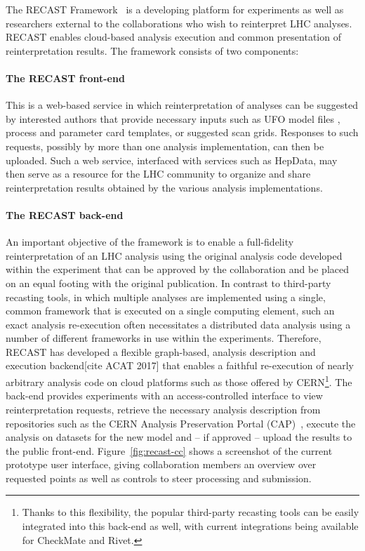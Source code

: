 The RECAST Framework~\cite{Cranmer2011} is a developing platform for experiments as well as  researchers external to the collaborations who wish to reinterpret LHC analyses. RECAST enables cloud-based analysis execution and common presentation of reinterpretation results. The framework consists of two components:

\paragraph{The RECAST front-end} This is a web-based service in which reinterpretation of analyses can be suggested by interested authors that provide necessary inputs such as UFO model files \cite{Degrande:2011ua}, process and parameter card templates, or suggested scan grids. Responses to such requests, possibly by more than one analysis implementation, can then be uploaded. Such a web service, interfaced with services such as HepData, may then serve as a resource for the LHC community to organize and share reinterpretation results obtained by the various analysis implementations.

\paragraph{The RECAST back-end} An important objective of the framework is to enable a full-fidelity reinterpretation of an LHC analysis using the original analysis code developed within the experiment that can be approved by the collaboration and be placed on an equal footing with the original publication. In contrast to third-party recasting tools, in which multiple analyses are implemented using a single, common framework that is  executed on a single computing element, such an exact analysis re-execution often necessitates a distributed data analysis using a number of different frameworks in use within the experiments. Therefore, RECAST has developed a flexible graph-based, analysis description and execution backend[cite ACAT 2017] that enables a faithful re-execution of nearly arbitrary analysis code on cloud platforms such as those offered by CERN\footnote{Thanks to this flexibility, the popular third-party recasting tools can  be easily integrated into this back-end as well, with current integrations being available for CheckMate and Rivet.}. The back-end provides experiments with an access-controlled interface to view reinterpretation requests, retrieve the necessary analysis description from repositories such as the CERN Analysis Preservation Portal (CAP)~\cite{CAP},  execute the analysis on datasets for the new model and -- if approved -- upload the results to the public front-end. Figure~\ref{fig:recast-cc} shows a screenshot of the current prototype user interface, giving collaboration members an overview over requested points as well as controls to steer processing and submission.

